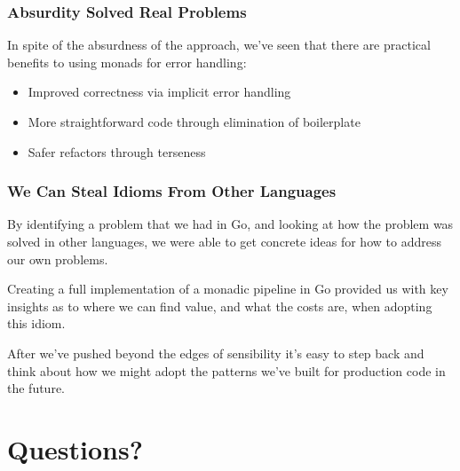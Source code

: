 \documentclass{beamer}
\begin{document}
\begin{frame}
  \frametitle{Absurdity Solved Real Problems}
  In spite of the absurdness of the approach, we've seen that there
  are practical benefits to using monads for error handling:
  \begin{itemize}
  \item Improved correctness via implicit error handling
  \item More straightforward code through elimination of boilerplate
  \item Safer refactors through terseness
  \end{itemize}
\end{frame}

\begin{frame}
  \frametitle{We Can Steal Idioms From Other Languages}
  By identifying a problem that we had in Go, and looking at how the
  problem was solved in other languages, we were able to get concrete
  ideas for how to address our own problems.

  Creating a full implementation of a monadic pipeline in Go provided
  us with key insights as to where we can find value, and what the
  costs are, when adopting this idiom.

  After we've pushed beyond the edges of sensibility it's easy to step
  back and think about how we might adopt the patterns we've built for
  production code in the future.
\end{frame}

\section{Questions?}
\end{document}
